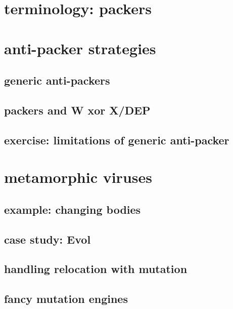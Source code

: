 \section{terminology: packers}


\section{anti-packer strategies} %
\subsection{generic anti-packers}


\subsection{packers and W xor X/DEP}


\subsection{exercise: limitations of generic anti-packer}


\section{metamorphic viruses}


\subsection{example: changing bodies}


\subsection{case study: Evol}


\subsection{handling relocation with mutation}


\subsection{fancy mutation engines}


